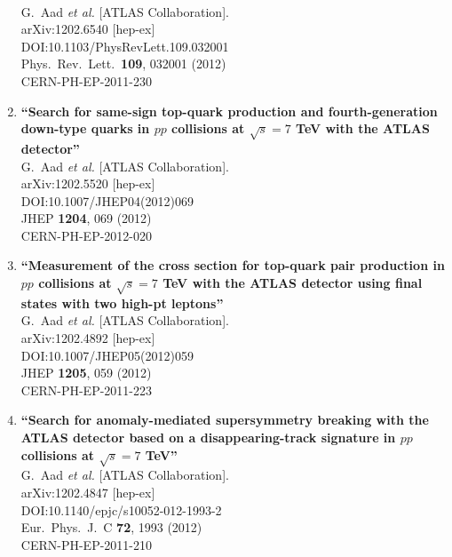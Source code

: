\documentclass{article}
\begin{document}
\begin{enumerate}
  \\{}G.~Aad {\it et al.} [ATLAS Collaboration].
  \\{}arXiv:1202.6540 [hep-ex]
  \\{}DOI:10.1103/PhysRevLett.109.032001
  \\{}Phys.\ Rev.\ Lett.\  {\bf 109}, 032001 (2012)
  \\{}CERN-PH-EP-2011-230
\item%
{\bf ``Search for same-sign top-quark production and fourth-generation down-type quarks in $pp$ collisions at $\sqrt{s}=7$ TeV with the ATLAS detector''}
  \\{}G.~Aad {\it et al.} [ATLAS Collaboration].
  \\{}arXiv:1202.5520 [hep-ex]
  \\{}DOI:10.1007/JHEP04(2012)069
  \\{}JHEP {\bf 1204}, 069 (2012)
  \\{}CERN-PH-EP-2012-020
\item%
{\bf ``Measurement of the cross section for top-quark pair production in $pp$ collisions at $\sqrt{s}=7$ TeV with the ATLAS detector using final states with two high-pt leptons''}
  \\{}G.~Aad {\it et al.} [ATLAS Collaboration].
  \\{}arXiv:1202.4892 [hep-ex]
  \\{}DOI:10.1007/JHEP05(2012)059
  \\{}JHEP {\bf 1205}, 059 (2012)
  \\{}CERN-PH-EP-2011-223
\item%
{\bf ``Search for anomaly-mediated supersymmetry breaking with the ATLAS detector based on a disappearing-track signature in $pp$ collisions at $\sqrt{s}=7$ TeV''}
  \\{}G.~Aad {\it et al.} [ATLAS Collaboration].
  \\{}arXiv:1202.4847 [hep-ex]
  \\{}DOI:10.1140/epjc/s10052-012-1993-2
  \\{}Eur.\ Phys.\ J.\ C {\bf 72}, 1993 (2012)
  \\{}CERN-PH-EP-2011-210

\end{enumerate}
\end{document}

